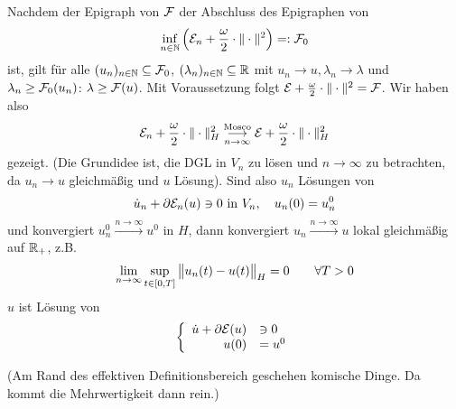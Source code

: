 Nachdem der Epigraph von $\mathcal{F}$ der Abschluss des Epigraphen von
\begin{align*}
	\inf\limits_{n\in\mathbb{N}}\left(\mathcal{E}_n+\frac{\omega}{2}\cdot\Vert\cdot\Vert^2\right)=:\mathcal{F}_0
\end{align*}
ist, gilt für alle $(u_n)_{n\in\mathbb{N}}\subseteq\mathcal{F}_0$, $(\lambda_n)_{n\in\mathbb{N}}\subseteq\mathbb{R}$ mit $u_n\longrightarrow u,\lambda_n\longrightarrow\lambda$ und $\lambda_n\geq\mathcal{F}_0(u_n)$: $\lambda\geq\mathcal{F}(u)$.
Mit Voraussetzung folgt $\mathcal{E}+\frac{\omega}{2}\cdot\Vert\cdot\Vert^2=\mathcal{F}$.
Wir haben also
\begin{align*}
	\mathcal{E}_n+\frac{\omega}{2}\cdot\Vert\cdot\Vert_H^2
	\underset{n\to\infty}{\overset{\text{Mosco}}{\longrightarrow}}
	\mathcal{E}+\frac{\omega}{2}\cdot\Vert\cdot\Vert_H^2
\end{align*}
gezeigt.
(Die Grundidee ist, die DGL in $V_n$ zu lösen und $n\to\infty$ zu betrachten, da $u_n\longrightarrow u$ gleichmäßig und $u$ Lösung).
Sind also $u_n$ Lösungen von 
\begin{align*}
	\dot{u}_n+\partial\mathcal{E}_n(u)\ni 0\text{ in }V_n,\quad u_n(0)=u_n^0
\end{align*}
und konvergiert $u_n^0\overset{n\to\infty}{\longrightarrow}u^0$ in $H$, dann konvergiert $u_n\overset{n\to\infty}{\longrightarrow}u$ lokal gleichmäßig auf $\mathbb{R}_+$, z.B.
\begin{align*}
	\lim\limits_{n\to\infty}\sup\limits_{t\in[0,T]}\big\Vert u_n(t)-u(t)\big\Vert_H=0\qquad\forall T>0
\end{align*}
$u$ ist Lösung von
\begin{align*}
	\left\lbrace	
	\begin{array}{rl}
		\dot{u}+\partial\mathcal{E}(u)&\ni0\\
		u(0)&=u^0
	\end{array}\right.
\end{align*}

(Am Rand des effektiven Definitionsbereich geschehen komische Dinge. 
Da kommt die Mehrwertigkeit dann rein.)


